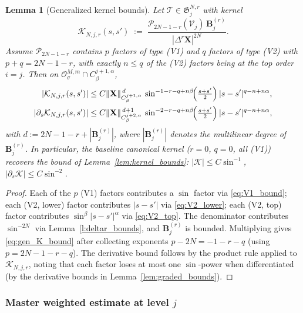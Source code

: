 \documentclass{amsart}
\newtheorem{lemma}[theorem]{Lemma}
\begin{document}
\begin{lemma}[Generalized kernel bounds]\label{lem:gen_kernel_bounds}
Let $\mathcal{T} \in \mathfrak{G}_j^{N,r}$ with kernel
\[
\mathcal{K}_{N,j,r}(s,s')
 \;:=\; \frac{\mathcal{P}_{2N-1-r}(\mathcal{V}_j)\,\mathbf{B}_j^{(r)}}{|\Delta^r\mathbf{X}|^{2N}}.
\]
Assume $\mathcal{P}_{2N-1-r}$ contains $p$ factors of type (V1) and $q$ factors of type (V2) with $p + q = 2N-1-r$, with exactly $n \le q$ of the (V2) factors being at the top order $i = j$.  Then on $\mathcal{O}^{M,m}_\sigma \cap C^{j+1,\alpha}_\beta$,
\begin{align}
|\mathcal{K}_{N,j,r}(s,s')|
 &\le C\|\mathbf{X}\|_{C^{j+1,\alpha}_\beta}^{\,d}\,
 \sin^{-1-r-q+n\beta}\!\Bigl(\tfrac{s+s'}{2}\Bigr)\,
 |s-s'|^{q-n + n\alpha},
 \label{eq:gen_K_bound}\\
|\partial_s\mathcal{K}_{N,j,r}(s,s')|
 &\le C\|\mathbf{X}\|_{C^{j+2,\alpha}_\beta}^{\,d+1}\,
 \sin^{-2-r-q+n\beta}\!\Bigl(\tfrac{s+s'}{2}\Bigr)\,
 |s-s'|^{q-n + n\alpha}, \label{eq:gen_dK_bound}
\end{align}
with $d := 2N-1-r+|\mathbf{B}_j^{(r)}|$, where $|\mathbf{B}_j^{(r)}|$ denotes the multilinear degree of $\mathbf{B}_j^{(r)}$.  In particular, the baseline canonical kernel ($r = 0$, $q = 0$, all (V1)) recovers the bound of Lemma~\ref{lem:kernel_bounds}: $|\mathcal{K}| \le C\sin^{-1}$, $|\partial_s\mathcal{K}| \le C\sin^{-2}$.
\end{lemma}

\begin{proof}
Each of the $p$ (V1) factors contributes a $\sin$ factor via \eqref{eq:V1_bound}; each (V2, lower) factor contributes $|s-s'|$ via \eqref{eq:V2_lower}; each (V2, top) factor contributes $\sin^\beta|s-s'|^\alpha$ via \eqref{eq:V2_top}.  The denominator contributes $\sin^{-2N}$ via Lemma~\ref{l:deltar_bounds}, and $\mathbf{B}_j^{(r)}$ is bounded.  Multiplying gives \eqref{eq:gen_K_bound} after collecting exponents $p - 2N = -1-r-q$ (using $p = 2N-1-r-q$).  The derivative bound follows by the product rule applied to $\mathcal{K}_{N,j,r}$, noting that each factor loses at most one $\sin$-power when differentiated (by the derivative bounds in Lemma~\ref{lem:graded_bounds}).
\end{proof}

\subsubsection{Master weighted estimate at level $j$}
\end{document}
